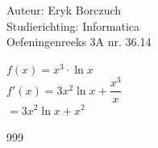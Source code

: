 \documentclass[a4paper]{article}
\begin{document}
  
\noindent \large Auteur: Eryk Borczuch \\
\noindent \large Studierichting: Informatica\\
\noindent \large Oefeningenreeks 3A nr. 36.14\\

\medskip

\normalsize

$f(x) = x^3 \cdot \ln x$\\

$f'(x) = 3x^2 \ln x+ \dfrac{x^3}{x}$\\

$= 3x^2 \ln x + x^2$\\

\begin{thebibliography}{999}
\end{thebibliography}
\end{document}
